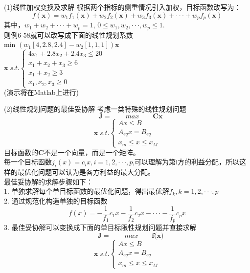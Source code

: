 \documentclass[12pt]{beamer}
\begin{document}
\begin{frame}[allowframebreaks]{(1)线性加权变换及求解}
	根据两个指标的侧重情况引入加权，目标函数改写为：
	$$f(\textbf{x}) = w_1f_1(\textbf{x})+ w_2f_2(\textbf{x})+ w_3f_3(\textbf{x})+\cdot \cdot \cdot+w_pf_p(\textbf{x})$$
	其中，$w_1+w_2+\cdot \cdot \cdot+w_p=1$, $0\leq w_1,w_2,\cdot \cdot \cdot,w_p\leq 1$.	
	\\则例6-58就可以改写成下面的线性规划系数\\
	\qquad min\qquad \qquad \qquad \qquad \qquad
	$(w_1[4,2.8,2.4]-w_2[1,1,1])\textbf{x}$
	\\
	$
	\textbf{x}\;s.t.
	\left\{
	\begin{array}{ccc}
		4x_1+2.8x_2+2.4x_3\leq20\\
		x_1+x_2+x_3\geq6\\
		x_1+x_2\geq3 \\
		x_1,x_2,x_3\geq0 
	\end{array} 
	\right.
	$
	\\(演示将在Matlab上进行)
\end{frame}

\begin{frame}[allowframebreaks]{(2)线性规划问题的最佳妥协解}
	考虑一类特殊的线性规划问题\\
	$$\quad \textbf{J} = \qquad max \qquad \textbf{Cx}$$
		$$
	\textbf{x}\;s.t.
	\left\{
	\begin{array}{ccc}
		Ax\leq B\\
		A_{eq}x=B_{eq}\\
		x_m\leq x\leq x_M
	\end{array} 
	\right.
	$$
	目标函数的\textbf{C}不是一个向量，而是一个矩阵。
	\\每一个目标函数$j_i(x) = c_ix,i=1,2,\cdot \cdot \cdot , p$,可以理解为第i方的利益分配，所以这样的最优化问题可以认为是各方利益的最大分配。
	\\最佳妥协解的求解步骤如下：
	\\1. 单独求解每个单目标函数的最优化问题，得出最优解$f_k, k=1,2,\cdot \cdot \cdot , p$
	\\2. 通过规范化构造单独的目标函数
	$$f(x) = -\frac{1}{f_1}c_1x-\frac{1}{f_2}c_2x-\cdot \cdot \cdot -\frac{1}{f_p}c_px$$
	3. 最佳妥协解可以变换成下面的单目标限性规划问题并直接求解
	$$\quad \textbf{J} = \qquad max \qquad \textbf{f(x)}$$
	$$
	\textbf{x}\;s.t.
	\left\{
	\begin{array}{ccc}
		Ax\leq B\\
		A_{eq}x=B_{eq}\\
		x_m\leq x\leq x_M
	\end{array} 
	\right.
	$$
\end{frame}
\end{document}
